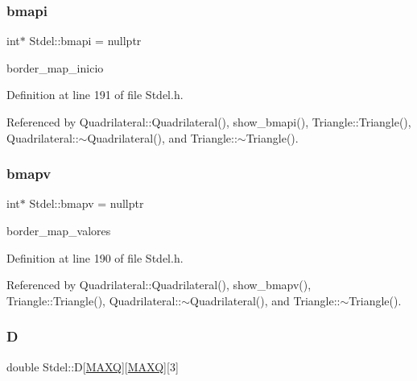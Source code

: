 \subsubsection{\texorpdfstring{bmapi}{bmapi}}
{\footnotesize\ttfamily int$\ast$ Stdel\+::bmapi = nullptr\hspace{0.3cm}{\ttfamily [protected]}}



border\+\_\+map\+\_\+inicio 



Definition at line 191 of file Stdel.\+h.



Referenced by Quadrilateral\+::\+Quadrilateral(), show\+\_\+bmapi(), Triangle\+::\+Triangle(), Quadrilateral\+::$\sim$\+Quadrilateral(), and Triangle\+::$\sim$\+Triangle().

\mbox{\label{classStdel_ac3cd818c98aa400279f28c22c8e0abaa}} 
\subsubsection{\texorpdfstring{bmapv}{bmapv}}
{\footnotesize\ttfamily int$\ast$ Stdel\+::bmapv = nullptr\hspace{0.3cm}{\ttfamily [protected]}}



border\+\_\+map\+\_\+valores 



Definition at line 190 of file Stdel.\+h.



Referenced by Quadrilateral\+::\+Quadrilateral(), show\+\_\+bmapv(), Triangle\+::\+Triangle(), Quadrilateral\+::$\sim$\+Quadrilateral(), and Triangle\+::$\sim$\+Triangle().

\mbox{\label{classStdel_a61f02fa483b00cb98ff5c8d951068211}} 
\subsubsection{\texorpdfstring{D}{D}}
{\footnotesize\ttfamily double Stdel\+::D\mbox{[}\hyperlink{MyOptions_8h_af708e94d886ba3f59582612949cac702}{M\+A\+XQ}\mbox{]}\mbox{[}\hyperlink{MyOptions_8h_af708e94d886ba3f59582612949cac702}{M\+A\+XQ}\mbox{]}\mbox{[}3\mbox{]}\hspace{0.3cm}{\ttfamily [protected]}}

